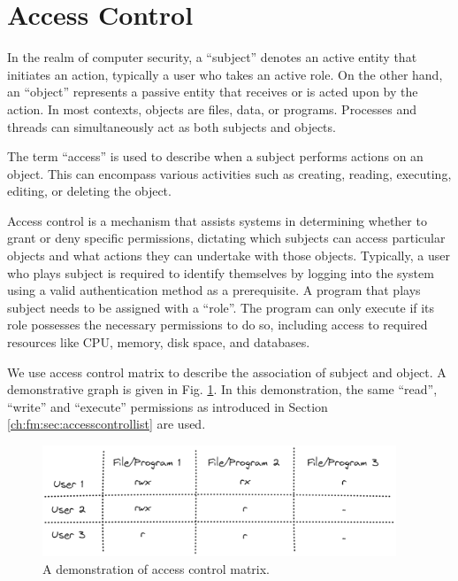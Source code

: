 \section{Access Control}

In the realm of computer security, a ``subject'' denotes an active entity that initiates an action, typically a user who takes an active role. On the other hand, an ``object'' represents a passive entity that receives or is acted upon by the action. In most contexts, objects are files, data, or programs. Processes and threads can simultaneously act as both subjects and objects.

The term ``access'' is used to describe when a subject performs actions on an object. This can encompass various activities such as creating, reading, executing, editing, or deleting the object.

Access control is a mechanism that assists systems in determining whether to grant or deny specific permissions, dictating which subjects can access particular objects and what actions they can undertake with those objects. Typically, a user who plays subject is required to identify themselves by logging into the system using a valid authentication method as a prerequisite. A program that plays subject needs to be assigned with a ``role''. The program can only execute if its role possesses the necessary permissions to do so, including access to required resources like CPU, memory, disk space, and databases.

We use access control matrix to describe the association of subject and object. A demonstrative graph is given in Fig. \ref{ch:ossec:fig:acmatrix}. In this demonstration, the same ``read'', ``write'' and ``execute'' permissions as introduced in Section \ref{ch:fm:sec:accesscontrollist} are used.

\begin{figure}
	\centering
	\includegraphics[width=300pt]{chapters/ch-computer-security-basics/figures/acmatrix.png}
	\caption{A demonstration of access control matrix.} \label{ch:ossec:fig:acmatrix}
\end{figure}















